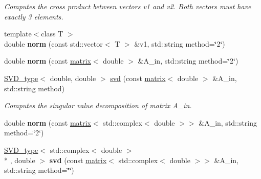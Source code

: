 \begin{DoxyCompactItemize}
\begin{DoxyCompactList}\small\item\em Computes the cross product between vectors v1 and v2. Both vectors must have exactly 3 elements. \end{DoxyCompactList}\item 
\hypertarget{namespacekeycpp_a85adf7a8804f7d7d3c378d86427b4210}{{\footnotesize template$<$class T $>$ }\\double {\bfseries norm} (const std\-::vector$<$ T $>$ \&v1, std\-::string method=\char`\"{}2\char`\"{})}\label{namespacekeycpp_a85adf7a8804f7d7d3c378d86427b4210}

\item 
\hypertarget{namespacekeycpp_aeb34bdd249af3ce92341cdda62f95f65}{double {\bfseries norm} (const \hyperlink{classkeycpp_1_1matrix}{matrix}$<$ double $>$ \&A\-\_\-in, std\-::string method=\char`\"{}2\char`\"{})}\label{namespacekeycpp_aeb34bdd249af3ce92341cdda62f95f65}

\item 
\hypertarget{namespacekeycpp_a838fc93d66e1ab63d68d04781086d81a}{\hyperlink{structkeycpp_1_1_s_v_d__type}{S\-V\-D\-\_\-type}$<$ double, double $>$ \hyperlink{namespacekeycpp_a838fc93d66e1ab63d68d04781086d81a}{svd} (const \hyperlink{classkeycpp_1_1matrix}{matrix}$<$ double $>$ \&A\-\_\-in, std\-::string method)}\label{namespacekeycpp_a838fc93d66e1ab63d68d04781086d81a}

\begin{DoxyCompactList}\small\item\em Computes the singular value decomposition of matrix A\-\_\-in. \end{DoxyCompactList}\item 
\hypertarget{namespacekeycpp_ad211ab5ae14ac9710265c662f70f20ff}{double {\bfseries norm} (const \hyperlink{classkeycpp_1_1matrix}{matrix}$<$ std\-::complex$<$ double $>$$>$ \&A\-\_\-in, std\-::string method=\char`\"{}2\char`\"{})}\label{namespacekeycpp_ad211ab5ae14ac9710265c662f70f20ff}

\item 
\hypertarget{namespacekeycpp_ab96149e6d3b76c5363601903c4fb72bb}{\hyperlink{structkeycpp_1_1_s_v_d__type}{S\-V\-D\-\_\-type}$<$ std\-::complex$<$ double $>$\\*
, double $>$ {\bfseries svd} (const \hyperlink{classkeycpp_1_1matrix}{matrix}$<$ std\-::complex$<$ double $>$$>$ \&A\-\_\-in, std\-::string method=\char`\"{}\char`\"{})}\label{namespacekeycpp_ab96149e6d3b76c5363601903c4fb72bb}


\end{DoxyCompactItemize}
